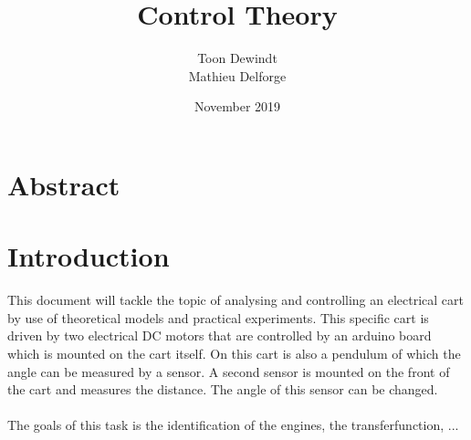 \documentclass{article}
\title{Control Theory}
\author{Toon Dewindt \\
Mathieu Delforge }
\date{November 2019}
\begin{document}
\maketitle
\clearpage
\section{Abstract}
\clearpage
\tableofcontents
\listoffigures
\clearpage
\section{Introduction}
This document will tackle the topic of analysing and controlling an electrical cart by use of theoretical models and practical experiments. This specific cart is driven by two electrical DC motors that are controlled by an arduino board which is mounted on the cart itself. On this cart is also a pendulum of which the angle can be measured by a sensor. A second sensor is mounted on the front of the cart and measures the distance. The angle of this sensor can be changed.\\
\\
The goals of this task is the identification of the engines, the transferfunction, ...






\clearpage

\end{document}
